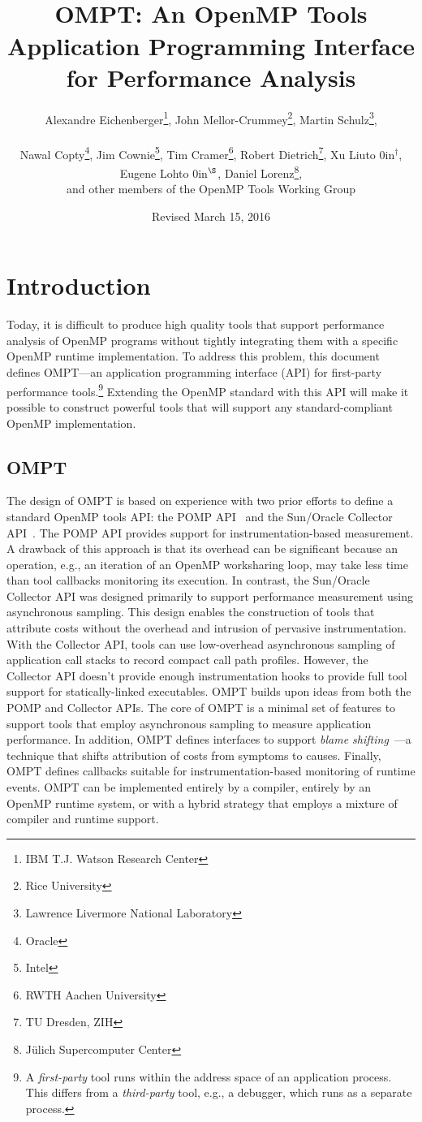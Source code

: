 \documentclass{article}
\title{OMPT: An OpenMP\textsuperscript{\textregistered} Tools Application Programming Interface for Performance Analysis}
\author{Alexandre Eichenberger\thanks{IBM T.J. Watson Research Center}, 
John Mellor-Crummey\thanks{Rice University}, 
Martin Schulz\thanks{Lawrence Livermore National Laboratory},
\\~\\
Nawal Copty\thanks{Oracle}, 
Jim Cownie\thanks{Intel},
Tim Cramer\thanks{RWTH Aachen University}, 
Robert Dietrich\thanks{TU Dresden, ZIH},
Xu Liu\hbox to 0in{$^\dagger$\hss},
Eugene Loh\hbox to 0in{$^\S$\hss}, 
Daniel Lorenz\thanks{J\"{u}lich Supercomputer Center}, 
\\
and other members of the OpenMP Tools Working Group}
\date{Revised March 15, 2016}
\begin{document}
  

                                           
\maketitle
\section{Introduction}
Today, it is difficult to produce high quality tools that support 
performance analysis of OpenMP programs without tightly integrating them with a specific OpenMP runtime implementation. To address this problem, this document defines OMPT---an application programming interface (API) for first-party performance tools.\footnote{A {\em first-party} tool runs within the address space of an application process. This differs from a {\em third-party} tool, e.g., a debugger, which runs as a separate process.}  
Extending the OpenMP standard with this API  will make it possible to construct powerful tools that will support any standard-compliant OpenMP implementation.

\subsection{OMPT}

The design of OMPT is based on experience with two prior efforts to define a standard OpenMP tools API: the POMP API~\cite{Mohr:EWOMP02} and the Sun/Oracle Collector API~\cite{SunCollector,Jost:2005:AND:1892830.1892858}. 
The POMP API provides support for instrumentation-based measurement. A drawback of this approach  is that its overhead can be significant because an operation, e.g., an iteration of an OpenMP worksharing loop, may take less time than tool callbacks monitoring its execution. 
In contrast, 
the Sun/Oracle Collector API was  designed primarily to support performance measurement 
using asynchronous sampling. This  design enables the construction of tools that attribute costs without the overhead and intrusion of pervasive instrumentation. With the Collector API, tools
 can use low-overhead asynchronous  sampling of application call stacks to record compact call path profiles. However, the Collector API doesn't provide enough instrumentation hooks to provide full tool support for statically-linked executables.
OMPT builds upon ideas from both the POMP and  Collector APIs. The core of OMPT is a minimal set of features to support tools that employ asynchronous sampling to measure application performance. In addition, OMPT defines  interfaces to support  {\em blame shifting}~\cite{Tallent:PPoPP09,Tallent:PPoPP10}---a technique that shifts attribution of costs from symptoms to causes.
Finally, OMPT defines callbacks suitable for instrumentation-based monitoring of runtime events. 
 OMPT can be implemented entirely by a compiler, entirely by an OpenMP runtime system, or with a hybrid strategy that employs a mixture of compiler and runtime support.
\end{document}
